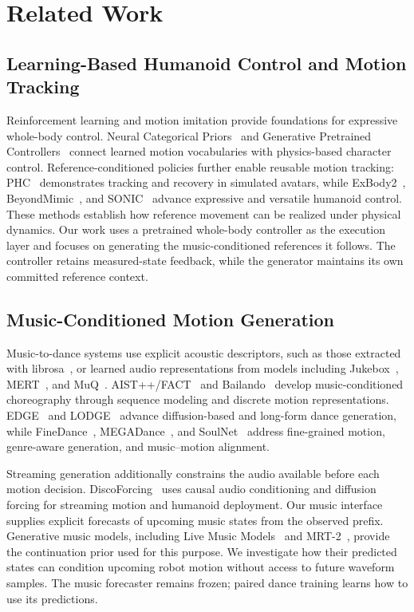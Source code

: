\section{Related Work}
\label{sec:related_work}

\subsection{Learning-Based Humanoid Control and Motion Tracking}

Reinforcement learning and motion imitation provide foundations
for expressive whole-body control.
Neural Categorical Priors~\cite{zhu2023ncp} and Generative
Pretrained Controllers~\cite{shi2026gpc} connect learned
motion vocabularies with physics-based character control.
Reference-conditioned policies further enable reusable
motion tracking: PHC~\cite{luo2023phc} demonstrates tracking
and recovery in simulated avatars, while
ExBody2~\cite{ji2024exbody2},
BeyondMimic~\cite{liao2025beyondmimic}, and
SONIC~\cite{luo2026sonic} advance expressive and versatile
humanoid control.
These methods establish how reference movement can be
realized under physical dynamics.
Our work uses a pretrained whole-body controller as the
execution layer and focuses on generating the music-conditioned
references it follows.
The controller retains measured-state feedback, while the
generator maintains its own committed reference context.

\subsection{Music-Conditioned Motion Generation}

Music-to-dance systems use explicit acoustic descriptors,
such as those extracted with librosa~\cite{mcfee2015librosa},
or learned audio representations from models including
Jukebox~\cite{dhariwal2020jukebox},
MERT~\cite{li2023mert}, and MuQ~\cite{zhu2025muq}.
AIST++/FACT~\cite{li2021aist} and
Bailando~\cite{siyao2022bailando} develop music-conditioned
choreography through sequence modeling and discrete motion
representations.
EDGE~\cite{tseng2023edge} and LODGE~\cite{li2024lodge}
advance diffusion-based and long-form dance generation,
while FineDance~\cite{li2023finedance},
MEGADance~\cite{yang2025megadance}, and
SoulNet~\cite{li2025soulnet} address fine-grained motion,
genre-aware generation, and music--motion alignment.

Streaming generation additionally constrains the audio
available before each motion decision.
DiscoForcing~\cite{ji2026discoforcing} uses causal audio
conditioning and diffusion forcing for streaming motion
and humanoid deployment.
Our music interface supplies explicit forecasts of upcoming
music states from the observed prefix.
Generative music models, including Live Music
Models~\cite{gdmlyria2025live} and
MRT-2~\cite{magenta2026mrt2}, provide the
continuation prior used for this purpose.
We investigate how their predicted states can condition
upcoming robot motion without access to future waveform
samples.
The music forecaster remains frozen; paired dance training
learns how to use its predictions.

